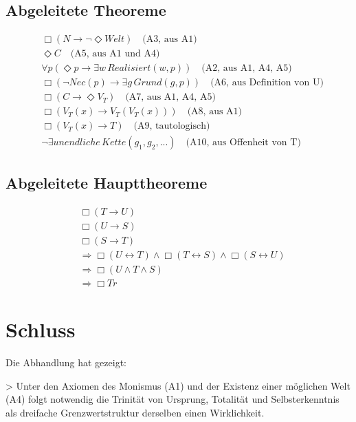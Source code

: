 \documentclass[
]{article}
\begin{document}
\subsection{Abgeleitete Theoreme}\label{abgeleitete-theoreme}

\[
\begin{aligned}
& \Box(N \rightarrow \neg\Diamond Welt) \quad \text{(A3, aus A1)} \\
& \Diamond C \quad \text{(A5, aus A1 und A4)} \\
& \forall p(\Diamond p \rightarrow \exists w\, Realisiert(w,p)) \quad \text{(A2, aus A1, A4, A5)} \\
& \Box(\neg Nec(p) \rightarrow \exists g\, Grund(g,p)) \quad \text{(A6, aus Definition von U)} \\
& \Box(C \rightarrow \Diamond V_T) \quad \text{(A7, aus A1, A4, A5)} \\
& \Box(V_T(x) \rightarrow V_T(V_T(x))) \quad \text{(A8, aus A1)} \\
& \Box(V_T(x) \rightarrow T) \quad \text{(A9, tautologisch)} \\
& \neg\exists unendliche\, Kette(g_1, g_2, ...) \quad \text{(A10, aus Offenheit von T)}
\end{aligned}
\]

\subsection{Abgeleitete Haupttheoreme}\label{abgeleitete-haupttheoreme}

\[
\begin{aligned}
& \Box(T \rightarrow U) \\
& \Box(U \rightarrow S) \\
& \Box(S \rightarrow T) \\
& \Rightarrow \Box(U \leftrightarrow T) \land \Box(T \leftrightarrow S) \land \Box(S \leftrightarrow U) \\
& \Rightarrow \Box(U \land T \land S) \\
& \Rightarrow \Box Tr
\end{aligned}
\]

\section{Schluss}\label{schluss}

Die Abhandlung hat gezeigt:

> Unter den Axiomen des Monismus (A1) und der Existenz einer möglichen Welt (A4) folgt notwendig die Trinität von Ursprung, Totalität und Selbsterkenntnis als dreifache Grenzwertstruktur derselben einen Wirklichkeit.
\end{document}
